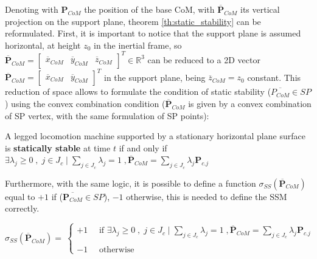 Denoting with $\mathbf{P}_{CoM}$ the position of the base CoM, with $\mathbf{\overline{P}}_{CoM}$ its vertical projection on the support plane, theorem \ref{th:static_stability} can be reformulated. 
First, it is important to notice that the support plane is assumed horizontal, at height $z_0$ in the inertial frame, so $\mathbf{\overline{P}}_{CoM} = \begin{bmatrix} \overline{x}_{CoM} & \overline{y}_{CoM} & \overline{z}_{CoM}\end{bmatrix}^T \in \mathbb{R}^3$ can be reduced to a 2D vector $\mathbf{\overline{P}}_{CoM} = \begin{bmatrix} \overline{x}_{CoM} & \overline{y}_{CoM}\end{bmatrix}^T$ in the support plane, being $\overline{z}_{CoM} = z_0$ constant.  
This reduction of space allows to formulate the condition of static stability ($\overline{P_{CoM}} \in SP$) using the convex combination condition ($\overline{\mathbf{P}}_{CoM}$ is given by a convex combination of SP vertex, with the same formulation of SP points):
\begin{theorem}\label{th:static_stability_math}
A legged locomotion machine supported by a stationary horizontal plane surface is \textbf{statically stable} at time $t$ if and only if \\ $\exists \lambda_j \ge 0 \;,\; j\in J_c \;|\; \sum_{j \in J_c} \lambda_j = 1 \;, \overline{\mathbf{P}}_{CoM} = \sum_{j \in J_c} \lambda_j \mathbf{P}_{c.j}$
\end{theorem}

\newpage
Furthermore, with the same logic, it is possible to define a function $\sigma_{SS}(\overline{\mathbf{P}}_{CoM})$ equal to $+1$ if ($\overline{\mathbf{P}_{CoM}} \in SP$), $-1$ otherwise, this is needed to define the SSM correctly. 

\begin{equation}
\label{eq:sigma_SS}
\sigma_{SS}(\overline{\mathbf{P}}_{CoM}) = \
    \begin{cases}
    +1 \quad\text{ if } \exists \lambda_j \ge 0 \;,\; j\in J_c \;|\; \sum_{j \in J_c} \lambda_j = 1 \;, \overline{\mathbf{P}}_{CoM} = \sum_{j \in J_c} \lambda_j \mathbf{P}_{c.j}\\ \\ 
    -1 \quad\text{ otherwise}
    \end{cases}
\end{equation}

